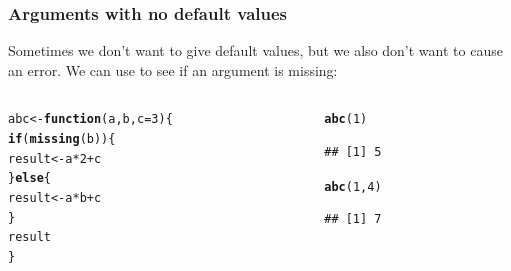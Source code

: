 \documentclass[12pt]{beamer}\usepackage[]{graphicx}\usepackage[]{color}
\makeatletter
\newcommand{\hlnum}[1]{\textcolor[rgb]{0.686,0.059,0.569}{#1}}%
\newcommand{\hlopt}[1]{\textcolor[rgb]{0,0,0}{#1}}%
\newcommand{\hlstd}[1]{\textcolor[rgb]{0.345,0.345,0.345}{#1}}%
\newcommand{\hlkwa}[1]{\textcolor[rgb]{0.161,0.373,0.58}{\textbf{#1}}}%
\newcommand{\hlkwb}[1]{\textcolor[rgb]{0.69,0.353,0.396}{#1}}%
\newcommand{\hlkwc}[1]{\textcolor[rgb]{0.333,0.667,0.333}{#1}}%
\newcommand{\hlkwd}[1]{\textcolor[rgb]{0.737,0.353,0.396}{\textbf{#1}}}%
\newenvironment{kframe}{%
 \def\at@end@of@kframe{}%
 \ifinner\ifhmode%
  \def\at@end@of@kframe{\end{minipage}}%
  \begin{minipage}{\columnwidth}%
 \fi\fi%
 \def\FrameCommand##1{\hskip\@totalleftmargin \hskip-\fboxsep
 \colorbox{shadecolor}{##1}\hskip-\fboxsep
     \hskip-\linewidth \hskip-\@totalleftmargin \hskip\columnwidth}%
 \MakeFramed {\advance\hsize-\width
   \@totalleftmargin\z@ \linewidth\hsize
   \@setminipage}}%
 {\par\unskip\endMakeFramed%
 \at@end@of@kframe}
\newenvironment{knitrout}{}{} %
\makeatother
\begin{document}
\begin{frame}[fragile]
\frametitle{Arguments with no default values}

Sometimes we don't want to give default values, but we also don't want to cause an error. We can use {\hilit {}} to see if an argument is missing:

\begin{columns}[t]
\begin{column}{0.5\textwidth}
\begin{knitrout}\footnotesize
{}\color{fgcolor}\begin{kframe}
\begin{alltt}
\hlstd{abc} \hlkwb{<-} \hlkwa{function}\hlstd{(}\hlkwc{a}\hlstd{,} \hlkwc{b}\hlstd{,} \hlkwc{c} \hlstd{=} \hlnum{3}\hlstd{) \{}
  \hlkwa{if} \hlstd{(}\hlkwd{missing}\hlstd{(b)) \{}
    \hlstd{result} \hlkwb{<-} \hlstd{a} \hlopt{*} \hlnum{2} \hlopt{+} \hlstd{c}
  \hlstd{\}} \hlkwa{else} \hlstd{\{}
    \hlstd{result} \hlkwb{<-} \hlstd{a} \hlopt{*} \hlstd{b} \hlopt{+} \hlstd{c}
  \hlstd{\}}
  \hlstd{result}
\hlstd{\}}
\end{alltt}
\end{kframe}
\end{knitrout}
\end{column}

\begin{column}{0.4\textwidth}
\begin{knitrout}\footnotesize
{}\color{fgcolor}\begin{kframe}
\begin{alltt}
\hlkwd{abc}\hlstd{(}\hlnum{1}\hlstd{)}
\end{alltt}
\begin{verbatim}
## [1] 5
\end{verbatim}
\begin{alltt}
\hlkwd{abc}\hlstd{(}\hlnum{1}\hlstd{,} \hlnum{4}\hlstd{)}
\end{alltt}
\begin{verbatim}
## [1] 7
\end{verbatim}
\end{kframe}
\end{knitrout}
\end{column}
\end{columns}

\end{frame}

\end{document}
